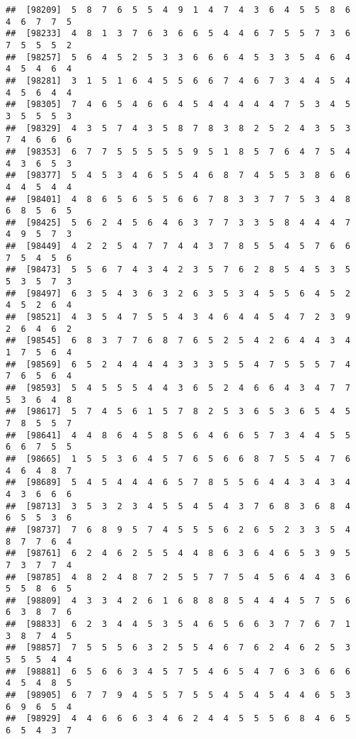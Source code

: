 \documentclass[
]{book}
\begin{document}
\begin{verbatim}
##  [98209]  5  8  7  6  5  5  4  9  1  4  7  4  3  6  4  5  5  8  6  4  6  7  7  5
##  [98233]  4  8  1  3  7  6  3  6  6  5  4  4  6  7  5  5  7  3  6  7  5  5  5  2
##  [98257]  5  6  4  5  2  5  3  3  6  6  6  4  5  3  3  5  4  6  4  4  5  4  6  4
##  [98281]  3  1  5  1  6  4  5  5  6  6  7  4  6  7  3  4  4  5  4  4  5  6  4  4
##  [98305]  7  4  6  5  4  6  6  4  5  4  4  4  4  4  7  5  3  4  5  3  5  5  5  3
##  [98329]  4  3  5  7  4  3  5  8  7  8  3  8  2  5  2  4  3  5  3  7  4  6  6  6
##  [98353]  6  7  7  5  5  5  5  5  9  5  1  8  5  7  6  4  7  5  4  4  3  6  5  3
##  [98377]  5  4  5  3  4  6  5  5  4  6  8  7  4  5  5  3  8  6  6  4  4  5  4  4
##  [98401]  4  8  6  5  6  5  5  6  6  7  8  3  3  7  7  5  3  4  8  6  8  5  6  5
##  [98425]  5  6  2  4  5  6  4  6  3  7  7  3  3  5  8  4  4  4  7  4  9  5  7  3
##  [98449]  4  2  2  5  4  7  7  4  4  3  7  8  5  5  4  5  7  6  6  7  5  4  5  6
##  [98473]  5  5  6  7  4  3  4  2  3  5  7  6  2  8  5  4  5  3  5  5  3  5  7  3
##  [98497]  6  3  5  4  3  6  3  2  6  3  5  3  4  5  5  6  4  5  2  4  5  2  6  4
##  [98521]  4  3  5  4  7  5  5  4  3  4  6  4  4  5  4  7  2  3  9  2  6  4  6  2
##  [98545]  6  8  3  7  7  6  8  7  6  5  2  5  4  2  6  4  4  3  4  1  7  5  6  4
##  [98569]  6  5  2  4  4  4  4  3  3  3  5  5  4  7  5  5  5  7  4  7  6  5  6  4
##  [98593]  5  4  5  5  5  4  4  3  6  5  2  4  6  6  4  3  4  7  7  5  3  6  4  8
##  [98617]  5  7  4  5  6  1  5  7  8  2  5  3  6  5  3  6  5  4  5  7  8  5  5  7
##  [98641]  4  4  8  6  4  5  8  5  6  4  6  6  5  7  3  4  4  5  5  6  6  7  5  5
##  [98665]  1  5  5  3  6  4  5  7  6  5  6  6  8  7  5  5  4  7  6  4  6  4  8  7
##  [98689]  5  4  5  4  4  4  6  5  7  8  5  5  6  4  4  3  4  3  4  4  3  6  6  6
##  [98713]  3  5  3  2  3  4  5  5  4  5  4  3  7  6  8  3  6  8  4  6  5  5  3  6
##  [98737]  7  6  8  9  5  7  4  5  5  5  6  2  6  5  2  3  3  5  4  8  7  7  6  4
##  [98761]  6  2  4  6  2  5  5  4  4  8  6  3  6  4  6  5  3  9  5  7  3  7  7  4
##  [98785]  4  8  2  4  8  7  2  5  5  7  7  5  4  5  6  4  4  3  6  5  5  8  6  5
##  [98809]  4  3  3  4  2  6  1  6  8  8  8  5  4  4  4  5  7  5  6  6  3  8  7  6
##  [98833]  6  2  3  4  4  5  3  5  4  6  5  6  6  3  7  7  6  7  1  3  8  7  4  5
##  [98857]  7  5  5  5  6  3  2  5  5  4  6  7  6  2  4  6  2  5  3  5  5  5  4  4
##  [98881]  6  5  6  6  3  4  5  7  5  4  6  5  4  7  6  3  6  6  6  4  5  4  8  5
##  [98905]  6  7  7  9  4  5  5  7  5  5  4  5  4  5  4  4  6  5  3  6  9  6  5  4
##  [98929]  4  4  6  6  6  3  4  6  2  4  4  5  5  5  6  8  4  6  5  6  5  4  3  7

\end{verbatim}
\end{document}
